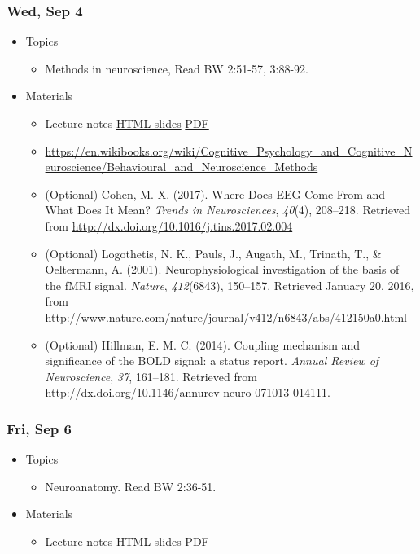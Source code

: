 \documentclass[]{article}
\providecommand{\tightlist}{%
  \setlength{\itemsep}{0pt}\setlength{\parskip}{0pt}}
\begin{document}
\hypertarget{wed-sep-4}{%
\subsubsection{Wed, Sep 4}\label{wed-sep-4}}

\begin{itemize}
\tightlist
\item
  Topics

  \begin{itemize}
  \tightlist
  \item
    Methods in neuroscience, Read BW 2:51-57, 3:88-92.
  \end{itemize}
\item
  Materials

  \begin{itemize}
  \tightlist
  \item
    Lecture notes \textbar{} \href{}{HTML slides} \textbar{}
    \href{}{PDF}
  \item
    \url{https://en.wikibooks.org/wiki/Cognitive_Psychology_and_Cognitive_Neuroscience/Behavioural_and_Neuroscience_Methods}
  \item
    (Optional) Cohen, M. X. (2017). Where Does EEG Come From and What
    Does It Mean? \emph{Trends in Neurosciences}, \emph{40}(4),
    208--218. Retrieved from
    \url{http://dx.doi.org/10.1016/j.tins.2017.02.004}
  \item
    (Optional) Logothetis, N. K., Pauls, J., Augath, M., Trinath, T., \&
    Oeltermann, A. (2001). Neurophysiological investigation of the basis
    of the fMRI signal. \emph{Nature}, \emph{412}(6843), 150--157.
    Retrieved January 20, 2016, from
    \url{http://www.nature.com/nature/journal/v412/n6843/abs/412150a0.html}
  \item
    (Optional) Hillman, E. M. C. (2014). Coupling mechanism and
    significance of the BOLD signal: a status report. \emph{Annual
    Review of Neuroscience}, \emph{37}, 161--181. Retrieved from
    \url{http://dx.doi.org/10.1146/annurev-neuro-071013-014111}.
  \end{itemize}
\end{itemize}

\hypertarget{fri-sep-6}{%
\subsubsection{Fri, Sep 6}\label{fri-sep-6}}

\begin{itemize}
\tightlist
\item
  Topics

  \begin{itemize}
  \tightlist
  \item
    Neuroanatomy. Read BW 2:36-51.
  \end{itemize}
\item
  Materials

  \begin{itemize}
  \tightlist
  \item
    Lecture notes \textbar{} \href{}{HTML slides} \textbar{}
    \href{}{PDF}
  \end{itemize}
\end{itemize}
\end{document}
